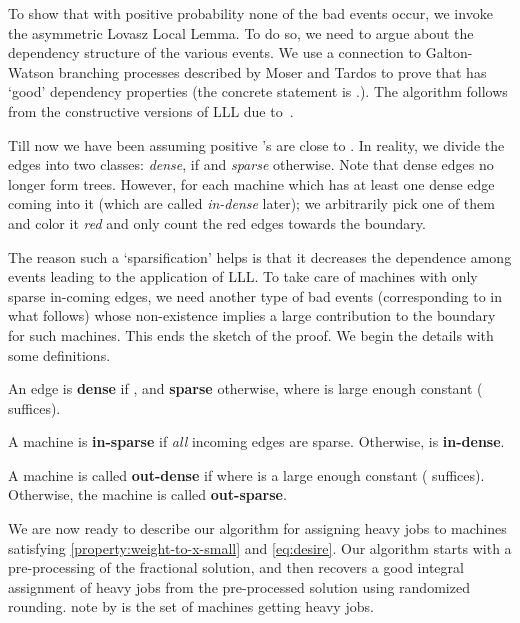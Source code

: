 \documentclass[11pt]{article}
\newenvironment{definition}{\begin{Definition}}{\end{Definition}}
\newtheorem{definition}[lemma]{Definition}
\newcounter{prop}
\begin{document}
To show that with positive probability none of the bad events occur, we invoke the asymmetric  Lovasz Local Lemma. To do so, we need to argue about the dependency structure of the various events.  We use a connection  to Galton-Watson branching processes described by Moser and Tardos to prove that  has `good' dependency properties (the concrete statement  is .). The algorithm follows from the constructive versions of LLL due to~\cite{MT10,HSS11}.

Till now we have been assuming positive 's are close to . In reality, we divide the edges into two classes: {\em dense}, if  and {\em sparse} otherwise.  Note that dense edges no longer form trees. However, for each machine which has at least one dense edge coming into it (which are called {\em in-dense} later); we arbitrarily pick one of them and color it {\em red} and only count the red edges towards the boundary. 

The reason such a `sparsification' helps is that it decreases the dependence among events leading to the application of LLL. To take care of machines with only sparse in-coming edges, we need another type of bad events  (corresponding to  in what follows) whose non-existence implies a large contribution to the boundary for such machines.  This ends the sketch of the proof.  We begin the details with some definitions.

\begin{definition}
An edge  is {\bf dense} if , and {\bf sparse} otherwise, where  is large enough constant ( suffices).
\end{definition}

\begin{definition}
A machine  is {\bf in-sparse} if {\em all} incoming edges  are sparse. Otherwise,  is  {\bf in-dense}.
\end{definition}

\begin{definition}
A machine  is called {\bf out-dense} if  where  is a large enough constant ( suffices). Otherwise, the machine is called {\bf out-sparse}.
\end{definition}

We are now ready to describe our algorithm for assigning heavy jobs to machines satisfying \ref{property:weight-to-x-small} and \ref{eq:desire}.  Our algorithm starts with a pre-processing of the fractional solution, and then recovers a good integral assignment of heavy jobs from the pre-processed solution using randomized rounding. note by  is the set of machines getting heavy jobs.
\end{document}
